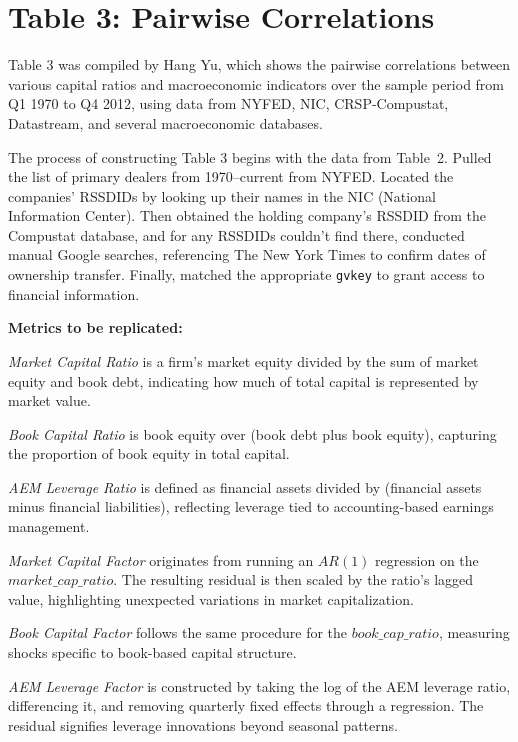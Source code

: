 \section*{Table 3: Pairwise Correlations}

Table 3 was compiled by Hang Yu, which shows the pairwise correlations between various capital ratios and macroeconomic indicators over the sample period from Q1 1970 to Q4 2012, using data from NYFED, NIC, CRSP-Compustat, Datastream, and several macroeconomic databases.

\par
The process of constructing Table 3 begins with the data from Table~2. Pulled the list of primary dealers from 1970--current from NYFED. Located the companies' RSSDIDs by looking up their names in the NIC (National Information Center). Then obtained the holding company's RSSDID from the Compustat database, and for any RSSDIDs couldn't find there, conducted manual Google searches, referencing The New York Times to confirm dates of ownership transfer. Finally, matched the appropriate \texttt{gvkey} to grant access to financial information.

\par
\textbf{Metrics to be replicated:}

\textit{Market Capital Ratio} is a firm's market equity divided by the sum of market equity and book debt, indicating how much of total capital is represented by market value.

\textit{Book Capital Ratio} is book equity over (book debt plus book equity), capturing the proportion of book equity in total capital.

\textit{AEM Leverage Ratio} is defined as financial assets divided by (financial assets minus financial liabilities), reflecting leverage tied to accounting-based earnings management.

\textit{Market Capital Factor} originates from running an \( AR(1) \) regression on the \( market\_cap\_ratio \). The resulting residual is then scaled by the ratio's lagged value, highlighting unexpected variations in market capitalization.

\textit{Book Capital Factor} follows the same procedure for the \( book\_cap\_ratio \), measuring shocks specific to book-based capital structure.

\textit{AEM Leverage Factor} is constructed by taking the log of the AEM leverage ratio, differencing it, and removing quarterly fixed effects through a regression. The residual signifies leverage innovations beyond seasonal patterns.

